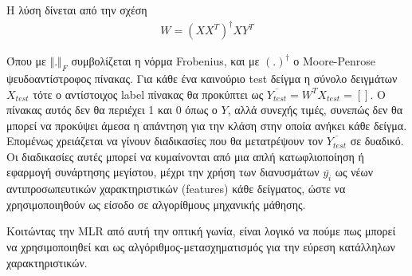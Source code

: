 \documentclass[11pt,a4paper,english,greek,twoside]{../Thesis}
\begin{document}
\par H λύση δίνεται από την σχέση
\begin{align}
W=(XX^T)^{\dagger} XY^T
\label{eqMLR4}
\end{align}
\par Όπου με $\Vert .\Vert_F$ συμβολίζεται η νόρμα Frobenius, και με $(.)^{\dagger}$ ο Moore-Penrose ψευδοαντίστροφος πίνακας. Για κάθε ένα καινούριο test δείγμα η σύνολο δειγμάτων $X_{test}$ τότε ο αντίστοιχος label πίνακας θα προκύπτει ως $\overline{Y_{test}}=W^TX_{test}=[]$. Ο πίνακας αυτός δεν θα περιέχει 1 και 0 όπως ο $Y$, αλλά συνεχής τιμές, συνεπώς δεν θα μπορεί να προκύψει άμεσα η απάντηση για την κλάση στην οποία ανήκει κάθε δείγμα. Επομένως χρειάζεται να γίνουν διαδικασίες που θα μετατρέψουν τον $\overline{Y_{test}}$ σε δυαδικό. Οι διαδικασίες αυτές μπορεί να κυμαίνονται από μια απλή κατωφλιοποίηση  ή εφαρμογή συνάρτησης μεγίστου, μέχρι την χρήση των διανυσμάτων $\overline{y_i}$ ως νέων αντιπροσωπευτικών χαρακτηριστικών (features) κάθε δείγματος, ώστε να χρησιμοποιηθούν ως είσοδο σε αλγορίθμους μηχανικής μάθησης.
\par Κοιτώντας την MLR από αυτή την οπτική γωνία, είναι λογικό να πούμε πως μπορεί να χρησιμοποιηθεί και ως αλγόριθμος-μετασχηματισμός για την εύρεση κατάλληλων χαρακτηριστικών.
\end{document}
